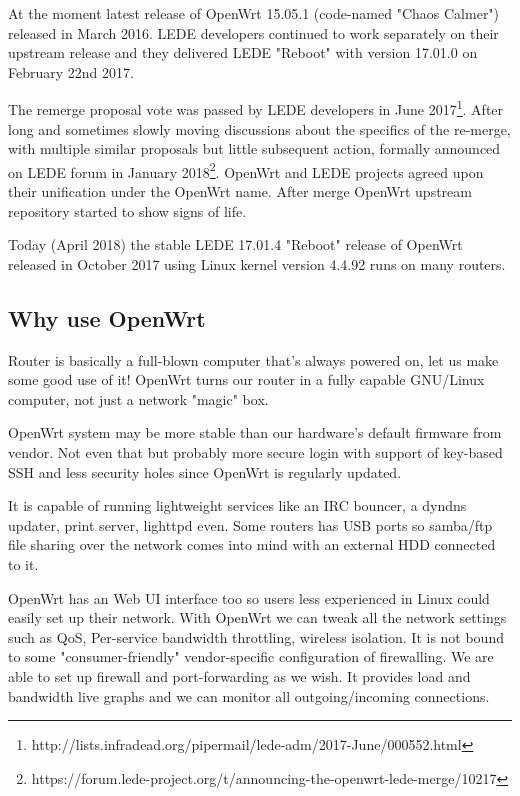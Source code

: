 At the moment latest release of OpenWrt 15.05.1 (code-named "Chaos Calmer") released in March 2016.
LEDE developers continued to work separately on their upstream release and they delivered LEDE "Reboot" with version 17.01.0 on February 22nd 2017.

The remerge proposal vote was passed by LEDE developers in June 2017\footnote{http://lists.infradead.org/pipermail/lede-adm/2017-June/000552.html}.
After long and sometimes slowly moving discussions about the specifics of the re-merge, with multiple similar proposals but little subsequent action, formally announced on LEDE forum in January 2018\footnote{https://forum.lede-project.org/t/announcing-the-openwrt-lede-merge/10217}.
OpenWrt and LEDE projects agreed upon their unification under the OpenWrt name.
After merge OpenWrt upstream repository started to show signs of life.

Today (April 2018) the stable LEDE 17.01.4 "Reboot" release of OpenWrt released in October 2017 using Linux kernel version 4.4.92 runs on many routers.

\subsection{Why use OpenWrt}

Router is basically a full-blown computer that's always powered on, let us make some good use of it!
OpenWrt turns our router in a fully capable GNU/Linux computer, not just a network "magic" box.

OpenWrt system may be more stable than our hardware’s default firmware from vendor.
Not even that but probably more secure login with support of key-based SSH and less security holes since OpenWrt is regularly updated.

It is capable of running lightweight services like an IRC bouncer, a dyndns updater, print server, lighttpd even.
Some routers has USB ports so samba/ftp file sharing over the network comes into mind with an external HDD connected to it.

OpenWrt has an Web UI interface too so users less experienced in Linux could easily set up their network.
With OpenWrt we can tweak all the network settings such as QoS, Per-service bandwidth throttling, wireless isolation.
It is not bound to some "consumer-friendly" vendor-specific configuration of firewalling.
We are able to set up firewall and port-forwarding as we wish.
It provides load and bandwidth live graphs and we can monitor all outgoing/incoming connections.

